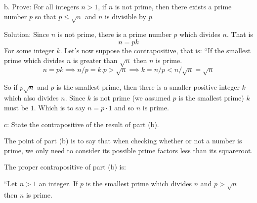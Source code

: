 \documentclass[16 pt]{amsart}
\theoremstyle{definition}
\theoremstyle{remark}
\numberwithin{equation}{subsection}
\begin{document}
\vspace{.5in}

b. Prove: For all integers $n>1$, if $n$ is not prime, then there exists a prime number $p$ so that $p\leq \sqrt{n}$ and $n$ is divisible by $p$.

\vspace{.5in}


Solution: Since $n$ is not prime, there is a prime number $p$ which divides $n$.  That is 
\[
n=pk
\]
For some integer $k$.
Let's now suppose the contrapositive, that is: ``If the smallest prime which divides $n$ is greater than $\sqrt{n}$ then $n$ is prime.
\[
n = pk \implies n/p = k. p>\sqrt{n} \implies k= n/p < n/\sqrt{n} = \sqrt{n}
\]


So if $p\sqrt{n}$ and $p$ is the smallest prime, then there is a smaller positive integer $k$ which also divides $n$.  Since $k$ is not prime (we assumed $p$ is the smallest prime) $k$ must be $1$.  Which is to say $n=p\cdot 1$ and so $n$ is prime.


\vspace{.5in}

c: State the contrapositive of the result of part (b). 

The point of part (b) is to say that when checking whether or not a number is prime, we only need to consider its possible prime factors less than its squareroot.

The proper contrapositive of part (b) is:

``Let $n>1$ an integer. If $p$ is the smallest prime which divides $n$ and $p>\sqrt{n}$ then $n$ is prime.
\end{document}
